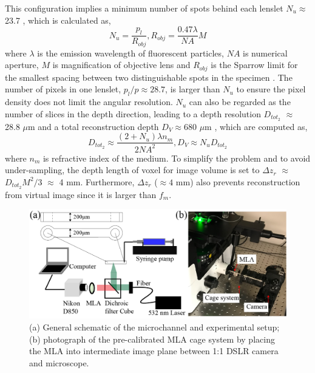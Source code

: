 \documentclass[draftthesis,fullpage]{uiucthesis}
\begin{document}
This configuration implies a minimum number of spots behind each lenslet $N_u\approx$ 23.7 \citep{levoy2006light}, which is calculated as,
\begin{equation}
  N_u = \frac{p_l}{R_{obj}}, R_{obj} = \frac{0.47\lambda}{NA}M
\label{eq:Nu}
\end{equation}
where $\lambda$ is the emission wavelength of fluorescent particles, $NA$ is numerical aperture, $M$ is magnification of objective lens and $R_{obj}$ is the Sparrow limit for the smallest spacing between two distinguishable spots in the specimen \citep{inoue2013video}. The number of pixels in one lenslet,  $p_l/p\approx 28.7$, is larger than $N_u$ to ensure the pixel density does not limit the angular resolution. $N_u$ can also be regarded as the number of slices in the depth direction, leading to a depth resolution $D_{tot_2}$ $\approx$ 28.8 $\mu$m and a total reconstruction depth $D_V\approx 680$ $\mu$m \citep{levoy2006light}, which are computed as,
\begin{equation}
  D_{tot_2} \approx \frac{(2 + N_u)\lambda n_m}{2NA^2}, D_V \approx N_uD_{tot_2}
\label{eq:DtotAndDV}
\end{equation}
where $n_m$ is refractive index of the medium. 
To simplify the problem and to avoid under-sampling, the depth length of voxel for image volume is set to $\Delta z_r$ $\approx$ $D_{tot_2}M^2/3$ $\approx$ 4 mm. Furthermore, $\Delta z_r$ ($\approx 4$ mm) also prevents reconstruction from virtual image since it is larger than $f_m$. 
\begin{figure}[h]
       \centerline{\includegraphics[width=0.8\linewidth]{fig/figure6.jpg}}
       \caption{(a) General schematic of the microchannel and experimental setup; (b) photograph of the pre-calibrated MLA cage system by placing the MLA into intermediate image plane between 1:1 DSLR camera and microscope.}
       \label{fig:setup}
\end{figure}
\end{document}
